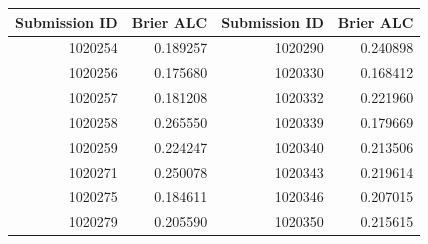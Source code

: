 \begin{tabular}{rr@{\qquad}rr}
\toprule
Submission ID & Brier ALC & Submission ID & Brier ALC\\
\midrule
1020254 & 0.189257 & 1020290 & 0.240898\\
1020256 & 0.175680 & 1020330 & 0.168412\\
1020257 & 0.181208 & 1020332 & 0.221960\\
1020258 & 0.265550 & 1020339 & 0.179669\\
1020259 & 0.224247 & 1020340 & 0.213506\\
1020271 & 0.250078 & 1020343 & 0.219614\\
1020275 & 0.184611 & 1020346 & 0.207015\\
1020279 & 0.205590 & 1020350 & 0.215615\\
\bottomrule
\end{tabular}

